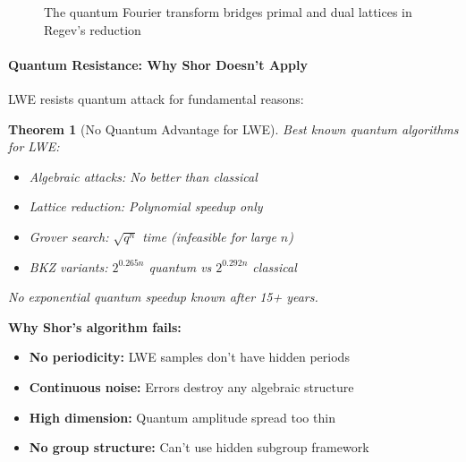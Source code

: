 \documentclass[11pt,a4paper]{article}
\newtheorem{theorem}{Theorem}
\begin{document}
\begin{figure}[h]
\centering
{}
\caption{The quantum Fourier transform bridges primal and dual lattices in Regev's reduction}
\end{figure}

\paragraph{Quantum Resistance: Why Shor Doesn't Apply}

LWE resists quantum attack for fundamental reasons:

\begin{theorem}[No Quantum Advantage for LWE]
Best known quantum algorithms for LWE:
\begin{itemize}
    \item Algebraic attacks: No better than classical
    \item Lattice reduction: Polynomial speedup only
    \item Grover search: $\sqrt{q^n}$ time (infeasible for large $n$)
    \item BKZ variants: $2^{0.265n}$ quantum vs $2^{0.292n}$ classical
\end{itemize}
No exponential quantum speedup known after 15+ years.
\end{theorem}

\textbf{Why Shor's algorithm fails:}
\begin{itemize}
    \item \textbf{No periodicity:} LWE samples don't have hidden periods
    \item \textbf{Continuous noise:} Errors destroy any algebraic structure
    \item \textbf{High dimension:} Quantum amplitude spread too thin
    \item \textbf{No group structure:} Can't use hidden subgroup framework
\end{itemize}
\end{document}
